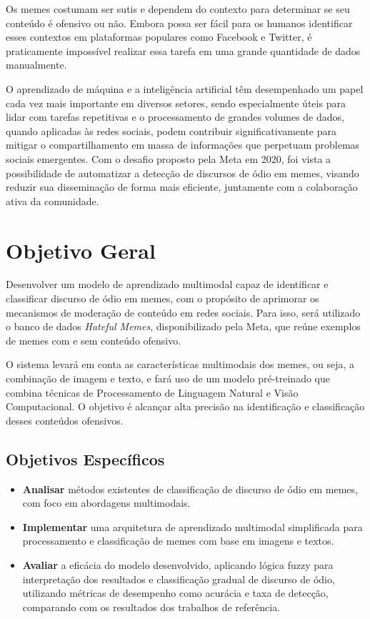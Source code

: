 Os memes costumam ser sutis e dependem do contexto para determinar se seu conteúdo é ofensivo ou não. Embora possa ser fácil para os humanos identificar esses contextos em plataformas populares como Facebook e Twitter, é praticamente impossível realizar essa tarefa em uma grande quantidade de dados manualmente. 

O aprendizado de máquina e a inteligência artificial têm desempenhado um papel cada vez mais importante em diversos setores, sendo especialmente úteis para lidar com tarefas repetitivas e o processamento de grandes volumes de dados, quando aplicadas às redes sociais, podem contribuir significativamente para mitigar o compartilhamento em massa de informações que perpetuam problemas sociais emergentes. Com o desafio proposto pela Meta em 2020, foi vista a possibilidade de automatizar a detecção de discursos de ódio em memes, visando reduzir sua disseminação de forma mais eficiente, juntamente com a colaboração ativa da comunidade.



\section{Objetivo Geral}

Desenvolver um modelo de aprendizado multimodal capaz de identificar e classificar discurso de ódio em memes, com o propósito de aprimorar os mecanismos de moderação de conteúdo em redes sociais. Para isso, será utilizado o banco de dados \textit{Hateful Memes}, disponibilizado pela Meta, que reúne exemplos de memes com e sem conteúdo ofensivo.

O sistema levará em conta as características multimodais dos memes, ou seja, a combinação de imagem e texto, e fará uso de um modelo pré-treinado que combina técnicas de Processamento de Linguagem Natural e Visão Computacional. O objetivo é alcançar alta precisão na identificação e classificação desses conteúdos ofensivos.

\subsection{Objetivos Específicos}

\begin{itemize}
    \item \textbf{Analisar} métodos existentes de classificação de discurso de ódio em memes, com foco em abordagens multimodais.
    \item \textbf{Implementar} uma arquitetura de aprendizado multimodal simplificada para processamento e classificação de memes com base em imagens e textos.
    \item \textbf{Avaliar} a eficácia do modelo desenvolvido, aplicando lógica fuzzy para interpretação dos resultados e classificação gradual de discurso de ódio, utilizando métricas de desempenho como acurácia e taxa de detecção, comparando com os resultados dos trabalhos de referência.
\end{itemize}
